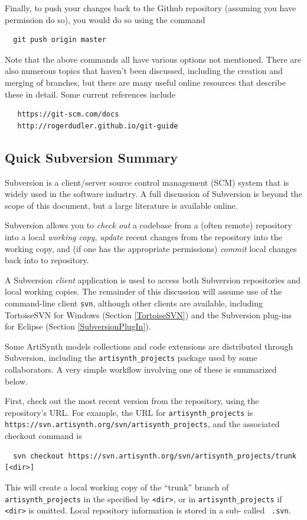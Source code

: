 Finally, to push your changes back to the Github repository (assuming
you have permission do so), you would do so using the command
\begin{verbatim}
  git push origin master
\end{verbatim}

Note that the above commands all have various options not mentioned.
There are also numerous topics that haven't been discussed, including
the creation and merging of branches, but there are many useful online
resources that describe these in detail. Some current references
include
\begin{verbatim}
   https://git-scm.com/docs
   http://rogerdudler.github.io/git-guide
\end{verbatim}

\subsection{Quick Subversion Summary}
\label{SubversionSummary}

Subversion is a client/server source control management (SCM) system
that is widely used in the software industry.  A full discussion of
Subversion is beyond the scope of this document, but a large
literature is available online. 

Subversion allows you to {\it check out} a codebase from a (often
remote) repository into a local {\it working copy}, {\it update}
recent changes from the repository into the working copy, and (if one
has the appropriate permissions) {\it commit} local changes back into
to repository.

A Subversion {\it client} application is used to access both
Subversion repositories and local working copies. The remainder of
this discussion will assume use of the command-line client {\tt svn},
although other clients are available, including TortoiseSVN for
Windows 
\ifWindows
(Section \ref{TortoiseSVN}) 
\fi
and the Subversion plug-ins for
Eclipse (Section \ref{SubversionPlugIn}).

Some ArtiSynth models collections and code extensions are distributed
through Subversion, including the {\tt artisynth\_projects} package
used by some collaborators. A very simple workflow involving one of
these is summarized below.

First, check out the most recent version from the repository, using
the repository's URL. For example, the URL for {\tt artisynth\_projects}
is {\tt https://svn.artisynth.org/svn/artisynth\_projects},
and the associated checkout command is
\begin{verbatim}
  svn checkout https://svn.artisynth.org/svn/artisynth_projects/trunk [<dir>]
\end{verbatim}
This will create a local working copy of the ``trunk'' branch of {\tt
artisynth\_projects} in the \directory{} specified by {\tt <dir>},
or in {\tt artisynth\_projects} if {\tt <dir>} is omitted. Local
repository information is stored in a sub-\directory{} called {\tt
.svn}.

